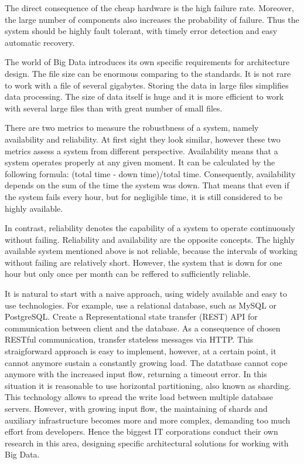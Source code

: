 The direct consequence of the cheap hardware is the high failure rate.
Moreover, the large number of components also increases the probability of failure. 
Thus the system should be highly fault tolerant, with timely error detection and easy automatic recovery.

The world of Big Data introduces its own specific requirements for architecture design.
The file size can be enormous comparing to the standards.
It is not rare to work with a file of several gigabytes.
Storing the data in large files simplifies data processing.
The size of data itself is huge and it is more efficient to work with several large files than with great number of small files.

There are two metrics to measure the robustbness of a system, namely availability and reliability.
At first sight they look similar, however these two metrics assess a system from different perspective.
Availability means that a system operates properly at any given moment.
It can be calculated by the following formula: (total time - down time)/total time.
Consequently, availability depends on the sum of the time the system was down.
That means that even if the system fails every hour, but for negligible time, it is still considered to be highly available.

In contrast, reliability denotes the capability of a system to operate continuously without failing.
Reliability and availability are the opposite concepts.
The highly available system mentioned above is not reliable, because the intervals of working without failing are relatively short.
However, the system that is down for one hour but only once per month can be reffered to sufficiently reliable.

It is natural to start with a naive approach, using widely available and easy to use technologies.
For example, use a relational database, such as MySQL or PostgreSQL.
Create a Representational state transfer (REST) API for communication between client and the database.
As a consequence of chosen RESTful communication, transfer stateless messages via HTTP.
This straigforward approach is easy to implement, however, at a certain point, it cannot anymore sustain a constantly growing load.
The datatbase cannot cope anymore with the increased input flow, returning a timeout error.
In this situation it is reasonable to use horizontal partitioning, also known as sharding.
This technology allows to spread the write load between multiple database servers.
However, with growing input flow, the maintaining of shards and auxiliary infrastructure becomes more and more complex, demanding too much effort from developers. 	   
Hence the biggest IT corporations conduct their own research in this area, designing specific architectural solutions for working with Big Data.


